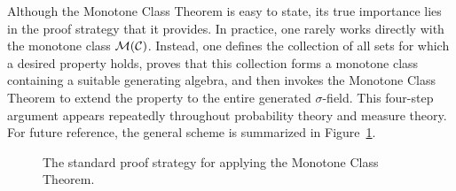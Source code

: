 \documentclass[../Main.tex]{subfiles}
\begin{document}
Although the Monotone Class Theorem is easy to state, its true importance lies in the proof strategy that it provides. In practice, one rarely works directly with the monotone class $\mathcal{M}(\mathcal{C})$. Instead, one defines the collection of all sets for which a desired property holds, proves that this collection forms a monotone class containing a suitable generating algebra, and then invokes the Monotone Class Theorem to extend the property to the entire generated $\sigma$-field. This four-step argument appears repeatedly throughout probability theory and measure theory. For future reference, the general scheme is summarized in Figure~\ref{fig:monotone_class_strategy}.

\begin{figure}[ht]
\centering
{}
\caption{The standard proof strategy for applying the Monotone Class Theorem.}
\label{fig:monotone_class_strategy}
\end{figure}
\end{document}
